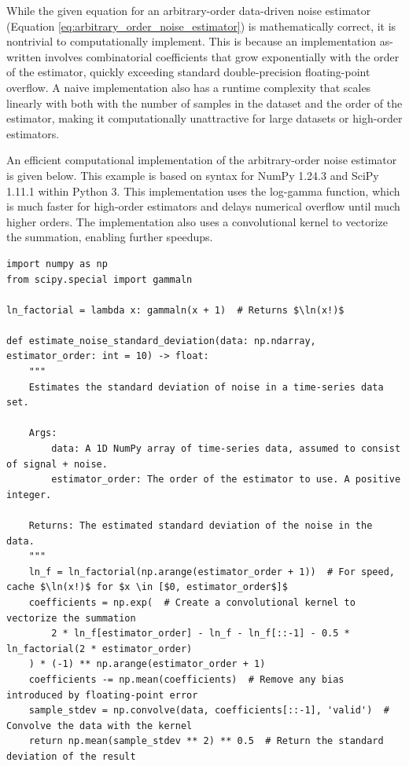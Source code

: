 \documentclass[conf]{new-aiaa}
\begin{document}
    While the given equation for an arbitrary-order data-driven noise estimator (Equation \ref{eq:arbitrary_order_noise_estimator}) is mathematically correct, it is nontrivial to computationally implement. This is because an implementation as-written involves combinatorial coefficients that grow exponentially with the order of the estimator, quickly exceeding standard double-precision floating-point overflow. A naive implementation also has a runtime complexity that scales linearly with both with the number of samples in the dataset and the order of the estimator, making it computationally unattractive for large datasets or high-order estimators.

    An efficient computational implementation of the arbitrary-order noise estimator is given below. This example is based on syntax for NumPy 1.24.3 and SciPy 1.11.1 within Python 3. This implementation uses the log-gamma function, which is much faster for high-order estimators and delays numerical overflow until much higher orders. The implementation also uses a convolutional kernel to vectorize the summation, enabling further speedups.

    \begin{listing}[H]
        \begin{verbatim}
import numpy as np
from scipy.special import gammaln

ln_factorial = lambda x: gammaln(x + 1)  # Returns $\ln(x!)$

def estimate_noise_standard_deviation(data: np.ndarray, estimator_order: int = 10) -> float:
    """
    Estimates the standard deviation of noise in a time-series data set.

    Args:
        data: A 1D NumPy array of time-series data, assumed to consist of signal + noise.
        estimator_order: The order of the estimator to use. A positive integer.

    Returns: The estimated standard deviation of the noise in the data.
    """
    ln_f = ln_factorial(np.arange(estimator_order + 1))  # For speed, cache $\ln(x!)$ for $x \in [$0, estimator_order$]$
    coefficients = np.exp(  # Create a convolutional kernel to vectorize the summation
        2 * ln_f[estimator_order] - ln_f - ln_f[::-1] - 0.5 * ln_factorial(2 * estimator_order)
    ) * (-1) ** np.arange(estimator_order + 1)
    coefficients -= np.mean(coefficients)  # Remove any bias introduced by floating-point error
    sample_stdev = np.convolve(data, coefficients[::-1], 'valid')  # Convolve the data with the kernel
    return np.mean(sample_stdev ** 2) ** 0.5  # Return the standard deviation of the result


        \end{verbatim}
        \caption{Example efficient implementation of the arbitrary-order noise estimator using NumPy/SciPy in Python 3.}
        \label{listing:efficient_arbitrary_order_noise_estimator}
    \end{listing}
\end{document}
